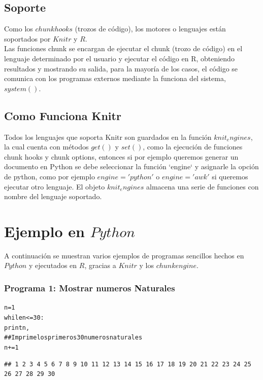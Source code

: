 \documentclass{article}\usepackage[]{graphicx}\usepackage[]{color}
\makeatletter
\newenvironment{kframe}{%
 \def\at@end@of@kframe{}%
 \ifinner\ifhmode%
  \def\at@end@of@kframe{\end{minipage}}%
  \begin{minipage}{\columnwidth}%
 \fi\fi%
 \def\FrameCommand##1{\hskip\@totalleftmargin \hskip-\fboxsep
 \colorbox{shadecolor}{##1}\hskip-\fboxsep
     \hskip-\linewidth \hskip-\@totalleftmargin \hskip\columnwidth}%
 \MakeFramed {\advance\hsize-\width
   \@totalleftmargin\z@ \linewidth\hsize
   \@setminipage}}%
 {\par\unskip\endMakeFramed%
 \at@end@of@kframe}
\newenvironment{knitrout}{}{} %
\makeatother
\begin{document}
\subsection*{Soporte}

Como los $chunk hooks$ (trozos de código), los motores o lenguajes están soportados por $Knitr$ y $R$.\\

Las funciones chunk se encargan de ejecutar el chunk (trozo de código) en el lenguaje determinado por el usuario y ejecutar el código en R, obteniendo resultados y mostrando su salida, para la mayoría de los casos, el código se comunica con los programas externos mediante la funciona del sistema, $system()$.\\

\subsection*{Como Funciona Knitr}

Todos los lenguajes que soporta Knitr son guardados en la función $knit_engines$, la cual cuenta con métodos $get()$ y $set()$, como la ejecución de funciones chunk hooks y chunk options, entonces si por ejemplo queremos generar un documento en Python se debe seleccionar la función `engine` y asignarle la opción de python, como por ejemplo $engine='python'$ o $engine='awk'$ si queremos ejecutar otro lenguaje. El objeto $knit_engines$ almacena una serie de funciones con nombre del lenguaje soportado.\\

\section*{Ejemplo en $Python$}

A continuación se muestran varios ejemplos de programas sencillos hechos en $Python$ y ejecutados en $R$, gracias a $Knitr$ y los $chunk engine$.

\subsubsection*{Programa 1: Mostrar numeros Naturales}
\begin{knitrout}
\color{fgcolor}\begin{kframe}
\begin{alltt}
n = 1
while n <= 30: 
    print n,
## Imprime los primeros 30 numeros naturales
    n += 1
\end{alltt}

\begin{verbatim}
## 1 2 3 4 5 6 7 8 9 10 11 12 13 14 15 16 17 18 19 20 21 22 23 24 25 26 27 28 29 30
\end{verbatim}
\end{kframe}
\end{knitrout}
\end{document}

